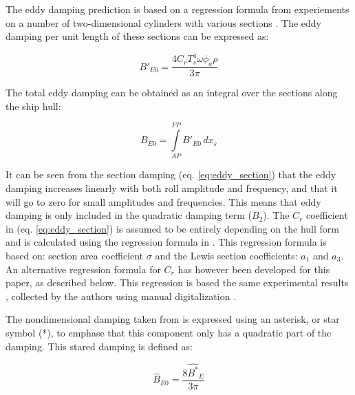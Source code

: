     The eddy damping prediction is based on a regression formula from
experiements on a number of two-dimensional cylinders with various
sections \citep{7505983/4AFVVGNT}. The eddy damping per unit length of
these sections can be expressed as: 
 
            
    
    \begin{equation}
B'_{E0} = \frac{4 C_{r} T_{s}^{4} \omega \phi_{a} \rho}{3 \pi}
\label{eq:eddy_section}
\end{equation}

    

    The total eddy damping can be obtained as an integral over the sections
along the ship hull:
 
            
    
    \begin{equation}
B_{E0} = \int\limits_{AP}^{FP} B'_{E0}\, dx_{s}
\label{eq:eddy_integration}
\end{equation}

    

    It can be seen from the section damping (eq.
\ref{eq:eddy_section}) that the eddy damping increases linearly
with both roll amplitude and frequency, and that it will go to zero for
small amplitudes and frequencies. This means that eddy damping is only
included in the quadratic damping term ($B_2$). The $C_r$
coefficient in (eq. \ref{eq:eddy_section}) is assumed to be
entirely depending on the hull form and is calculated using the
regression formula in \citep{7505983/4AFVVGNT}. This regression formula
is based on: section area coefficient $\sigma$ and the Lewis section
coefficients: $a_1$ and $a_3$. An alternative regression formula for
$C_r$ has however been developed for this paper, as described below.
This regression is based the same experimental results
\citep{7505983/4AFVVGNT}, collected by the authors using manual
digitalization \citep{7505983/RXYIE6UW}.

    The nondimensional damping taken from \citep{7505983/4AFVVGNT} is
expressed using an asterisk, or star symbol (*), to emphase that this
component only has a quadratic part of the damping. This stared damping
is defined as:
 
            
    
    \begin{equation}
\hat{B}_{E0} = \frac{8 \hat{B^*}_{E}}{3 \pi}
\label{eq:B_E_star_hat}
\end{equation}

    

